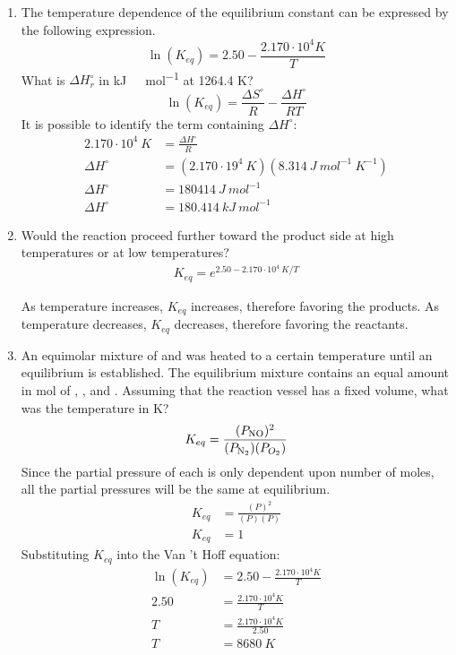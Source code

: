 \documentclass{article}
\begin{document}
\begin{enumerate}
    \item The temperature dependence of the equilibrium constant can be expressed by the following expression. 
    $$\ln(K_{eq})=2.50-\frac{2.170\cdot10^{4} \si{K}}{T}$$
    What is $\Delta H^{\circ}_{r}$ in \si{kJ\ mol^{-1}} at 1264.4 \si{K}?
    $$\ln(K_{eq})=\frac{\Delta S^{\circ}}{R}-\frac{\Delta H^{\circ}}{RT}$$
    It is possible to identify the term containing $\Delta H^{\circ}$:
    \begin{align*}
        2.170\cdot10^4\ \si{K}&=\frac{\Delta H^{\circ}}{R}\\
        \Delta H^{\circ}&=(2.170\cdot19^{4}\ \si{K})(8.314\ \si{J\ mol^{-1}\ K^{-1}})\\
        \Delta H^{\circ}&=180414\ \si{J\ mol^{-1}}\\
        \Delta H^{\circ}&=180.414\ \si{kJ\ mol^{-1}}
    \end{align*}
    
    \item Would the reaction proceed further toward the product side at high temperatures or at low temperatures?
    \begin{align*}
        K_{eq}=e^{2.50-2.170\cdot10^{4}\ \si{K}/T}
    \end{align*}
    
    As temperature increases, $K_{eq}$ increases, therefore favoring the products. As temperature decreases, $K_{eq}$ decreases, therefore favoring the reactants.
    
    \item An equimolar mixture of  and  was heated to a certain temperature until an equilibrium is established. The equilibrium mixture contains an equal amount in \si{mol} of , , and . Assuming that the reaction vessel has a fixed volume, what was the temperature in \si{K}?
    \begin{align*}
        K_{eq}=\frac{(P_{\ce{NO}})^{2}}{(P_{\ce{N_{2}}})(P_{O_{2}})}
    \end{align*}
    Since the partial pressure of each is only dependent upon number of moles, all the partial pressures will be the same at equilibrium.
    \begin{align*}
        K_{eq}&=\frac{(P)^{2}}{(P)(P)}\\
        K_{eq}&=1
    \end{align*}
    Substituting $K_{eq}$ into the Van 't Hoff equation:
    \begin{align*}
        \ln(K_{eq})&=2.50-\frac{2.170\cdot10^{4} \si{K}}{T}\\
        2.50&=\frac{2.170\cdot10^{4} \si{K}}{T}\\
        T&=\frac{2.170\cdot10^{4} \si{K}}{2.50}\\
        T&=8680\ \si{K}
    \end{align*}
    

\end{enumerate}
\end{document}
